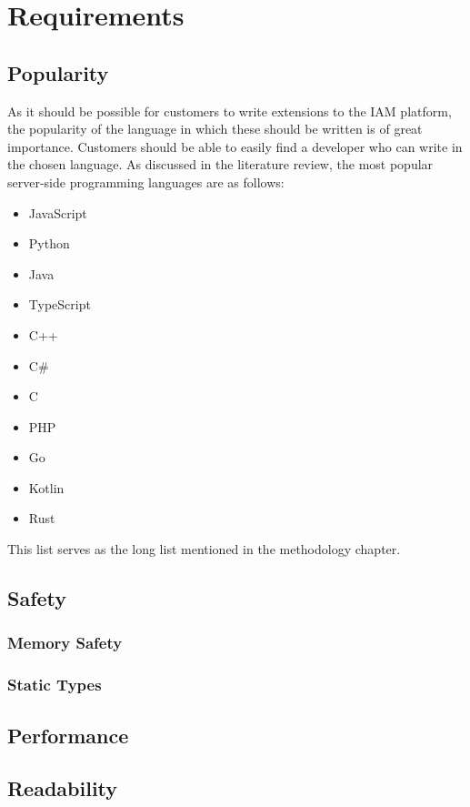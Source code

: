 \chapter{Requirements}
\label{ch:requirements}

\section{Popularity}
As it should be possible for customers to write extensions to the IAM platform, the popularity of the language in which these should be written is of great importance. Customers should be able to easily find a developer who can write in the chosen language. As discussed in the literature review, the most popular server-side programming languages are as follows:
\begin{itemize}
    \item JavaScript
    \item Python
    \item Java
    \item TypeScript
    \item C++
    \item C\#
    \item C
    \item PHP
    \item Go
    \item Kotlin
    \item Rust
\end{itemize}

This list serves as the long list mentioned in the methodology chapter.

\section{Safety}
\subsection{Memory Safety}
\subsection{Static Types}

\section{Performance}

\section{Readability}
